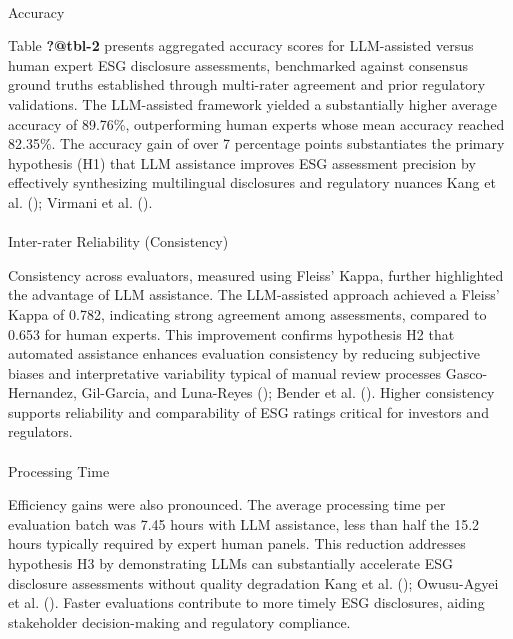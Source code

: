 \documentclass[
  12pt,
]{article}
\makeatletter
\let\oldparagraph\paragraph
\renewcommand{\paragraph}{
    \@ifstar
      \xxxParagraphStar
      \xxxParagraphNoStar
  }
\newcommand{\xxxParagraphStar}[1]{\oldparagraph*{#1}\mbox{}}
\newcommand{\xxxParagraphNoStar}[1]{\oldparagraph{#1}\mbox{}}
\makeatother
\begin{document}
\paragraph{Accuracy}\label{accuracy}

Table \textbf{?@tbl-2} presents aggregated accuracy scores for
LLM-assisted versus human expert ESG disclosure assessments, benchmarked
against consensus ground truths established through multi-rater
agreement and prior regulatory validations. The LLM-assisted framework
yielded a substantially higher average accuracy of 89.76\%,
outperforming human experts whose mean accuracy reached 82.35\%. The
accuracy gain of over 7 percentage points substantiates the primary
hypothesis (H1) that LLM assistance improves ESG assessment precision by
effectively synthesizing multilingual disclosures and regulatory nuances
Kang et al. (); Virmani et al.
().

\paragraph{Inter-rater Reliability
(Consistency)}\label{inter-rater-reliability-consistency}

Consistency across evaluators, measured using Fleiss' Kappa, further
highlighted the advantage of LLM assistance. The LLM-assisted approach
achieved a Fleiss' Kappa of 0.782, indicating strong agreement among
assessments, compared to 0.653 for human experts. This improvement
confirms hypothesis H2 that automated assistance enhances evaluation
consistency by reducing subjective biases and interpretative variability
typical of manual review processes Gasco-Hernandez, Gil-Garcia, and
Luna-Reyes (); Bender et al.
(). Higher consistency supports
reliability and comparability of ESG ratings critical for investors and
regulators.

\paragraph{Processing Time}\label{processing-time}

Efficiency gains were also pronounced. The average processing time per
evaluation batch was 7.45 hours with LLM assistance, less than half the
15.2 hours typically required by expert human panels. This reduction
addresses hypothesis H3 by demonstrating LLMs can substantially
accelerate ESG disclosure assessments without quality degradation Kang
et al. (); Owusu-Agyei et al.
(). Faster evaluations contribute to
more timely ESG disclosures, aiding stakeholder decision-making and
regulatory compliance.
\end{document}
